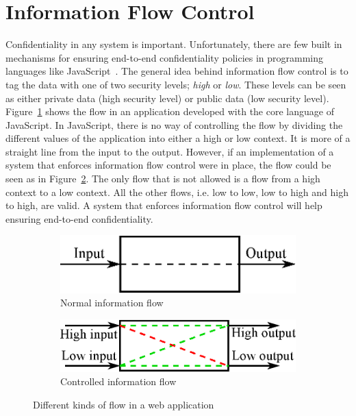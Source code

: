 \section{Information Flow Control}
Confidentiality in any system is important. Unfortunately, there are few built in mechanisms for ensuring end-to-end confidentiality policies in programming languages like JavaScript~\cite{ifc-jsac}. The general idea behind information flow control is to tag the data with one of two security levels; \emph{high} or \emph{low}. These levels can be seen as either private data (high security level) or public data (low security level). Figure~\ref{fig:normal_flow} shows the flow in an application developed with the core language of JavaScript. In JavaScript, there is no way of controlling the flow by dividing the different values of the application into either a high or low context. It is more of a straight line from the input to the output. However, if an implementation of a system that enforces information flow control were in place, the flow could be seen as in Figure~\ref{fig:controlled_flow}. The only flow that is not allowed is a flow from a high context to a low context. All the other flows, i.e. low to low, low to high and high to high, are valid. A system that enforces information flow control will help ensuring end-to-end confidentiality.
\begin{figure}[h]
  \begin{subfigure}{.5\textwidth}
    \includegraphics[scale=0.65]{images/flow_normal.eps}
    \caption{Normal information flow}
    \label{fig:normal_flow}
  \end{subfigure}
  \begin{subfigure}{.5\textwidth}
    \includegraphics[scale=0.65]{images/flow_controlled.eps}
    \caption{Controlled information flow}
    \label{fig:controlled_flow}
  \end{subfigure}
  \caption{Different kinds of flow in a web application}
  \label{fig:flows}
\end{figure}
